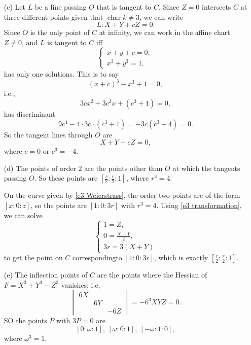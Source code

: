 \documentclass{article}
\theoremstyle{definition}
\theoremstyle{remark}
\DeclareMathOperator{\cha}{char} %
\begin{document}
\begin{enumerate}
    \item [(c)]
    Let $L$ be a line passing $O$ that is tangent to $C$. Since $Z = 0$ intersects $C$ at three different points given that $\cha k\ne 3$, we can write \[L : X + Y + cZ = 0.\]
    Since $O$ is the only point of $C$ at infinity, we can work in the affine chart $Z \ne 0$, and $L$ is tangent to $C$ iff\begin{equation}\label{e3 c 1}
        \begin{cases}
            x+y+c = 0,\\
            x^3+y^3=1,
        \end{cases}
    \end{equation} has only one solutions.
    This is to say \[(x + c)^3 - x^3 + 1 = 0,\] i.e., \[3cx^2 + 3c^2x+(c^3+1) = 0,\]
    has discriminant \[9c^4 - 4\cdot 3c\cdot (c^3 + 1) = -3c(c^3+4) = 0.\]
    So the tangent lines through $O$ are \[X+Y+cZ = 0,\]where $c = 0$ or $c^3 = -4$.
    \item [(d)] The points of order $2$ are the points other than $O$ at which the tangents passing $O$. So these points are $\left[ \frac{r}{2}: \frac{r}{2} :1\right]$, where $r^3 = 4$.

    On the curve given by \cref{e3 Weierstrass}, the order two points are of the form $[x : 0 : z]$, so the points are $[1 : 0 : 3r]$ with $r^3 = 4$. Using \cref{e3 transformation}, we can solve \[\begin{cases}
        1 = Z,\\
        0 = \frac{X-Y}{2},\\
        3r = 3(X+Y)
    \end{cases}\]to get the point on $C$ correspondingto $[1:0:3r]$, which is exactly $\left[ \frac{r}{2}: \frac{r}{2} :1\right]$.


    \item [(e)]
    The inflection points of $C$ are the points where the Hessian of $F = X^3 + Y^3 - Z^3$ vanishes; i.e, \[\begin{vmatrix}
        6X& & \\ & 6Y & \\ & &-6Z
    \end{vmatrix} = -6^3XYZ = 0.\]
    SO the points $P$ with $3P = 0$ are \[[0 : \omega : 1],\ [\omega : 0 : 1],\ [-\omega : 1 : 0],\]
    where $\omega^3 = 1$.


\end{enumerate}
\end{document}
